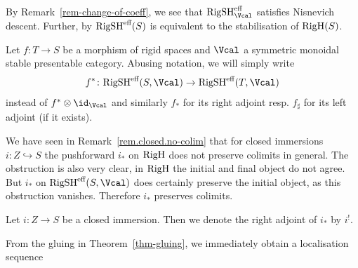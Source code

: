 \documentclass[colorinlistoftodos,article,11pt,reqno]{article}
\newcommand{\RigSH}{\textup{RigSH}}
\newcommand{\RigH}{\textup{RigH}}
\newcommand{\eff}{\textup{eff}}
\renewcommand{\to}[1][]{\overset{#1}{\rightarrow}}
\begin{document}
\begin{rem}
	By Remark~\ref{rem-change-of-coeff}, we see that $\RigSH^{\eff}_\Vcal$ satisfies Nisnevich descent. Further, by \cite[Ex. 4.8.1.23]{HA} $\RigSH^{\eff}(S)$ is equivalent to the stabilisation of $\RigH(S)$.
\end{rem}


\begin{notation}
	Let $f\colon T\rightarrow S$ be a morphism of rigid spaces and $\Vcal$ a symmetric monoidal stable presentable category. Abusing notation, we will simply write 
    $$
    f^{*}\colon \RigSH^{\eff}(S,\Vcal)\to \RigSH^{\eff}(T,\Vcal)
    $$
    instead of $f^{*}\otimes \id_{\Vcal}$ and similarly $f_{*}$ for its right adjoint resp. $f_{\sharp}$ for its left adjoint (if it exists).
\end{notation}


\begin{rem}
	 We have seen in Remark~\ref{rem.closed.no-colim} that for closed immersions $i\colon Z\hookrightarrow S$ the pushforward $i_{*}$ on $\RigH$ does not preserve colimits in general. The obstruction is also very clear, in $\RigH$ the initial and final object do not agree. But $i_{*}$ on $\RigSH^{\eff}(S,\Vcal)$ does certainly preserve the initial object, as this obstruction vanishes. Therefore $i_{*}$ preserves colimits.
\end{rem}

\begin{notation}
	Let $i\colon Z\rightarrow S$ be a closed immersion. Then we denote the right adjoint of $i_{*}$ by $i^{!}$.
\end{notation}

From the gluing in Theorem~\ref{thm-gluing}, we immediately obtain a localisation sequence
 
\end{document}
